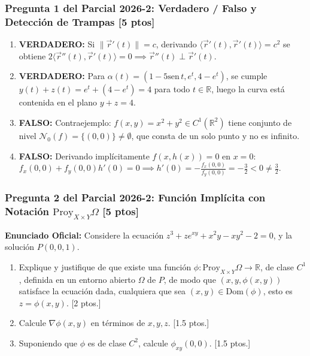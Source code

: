 \documentclass[11pt,a4paper]{article}
\begin{document}
\subsubsection*{Pregunta 1 del Parcial 2026-2: Verdadero / Falso y Detección de Trampas [5 ptos]}
\begin{enumerate}[label=\textbf{\alph*)}]
  \item \textbf{VERDADERO:} Si $\|\vec{r}'(t)\| = c$, derivando $\langle \vec{r}'(t), \vec{r}'(t)\rangle = c^2$ se obtiene $2\langle \vec{r}''(t), \vec{r}'(t)\rangle = 0 \implies \vec{r}''(t) \perp \vec{r}'(t)$.
  \item \textbf{VERDADERO:} Para $\alpha(t) = (1-5\text{sen}\,t, e^t, 4-e^t)$, se cumple $y(t)+z(t) = e^t + (4-e^t) = 4$ para todo $t\in\mathbb{R}$, luego la curva está contenida en el plano $y+z=4$.
  \item \textbf{FALSO:} Contraejemplo: $f(x,y) = x^2+y^2 \in C^1(\mathbb{R}^2)$ tiene conjunto de nivel $\mathcal{N}_0(f) = \{(0,0)\} \neq \emptyset$, que consta de un solo punto y no es infinito.
  \item \textbf{FALSO:} Derivando implícitamente $f(x,h(x))=0$ en $x=0$: $f_x(0,0) + f_y(0,0)h'(0) = 0 \implies h'(0) = -\frac{f_x(0,0)}{f_y(0,0)} = -\frac{3}{2} < 0 \neq \frac{3}{2}$.
\end{enumerate}

\subsubsection*{Pregunta 2 del Parcial 2026-2: Función Implícita con Notación $\text{Proy}_{X\times Y}\Omega$ [5 ptos]}
\begin{tcolorbox}[colback=white,colframe=gray!40,arc=1mm,boxrule=0.5pt]
\textbf{Enunciado Oficial:} Considere la ecuación $z^3 + z e^{xy} + x^2y - xy^2 - 2 = 0$, y la solución $P(0,0,1)$.
\begin{enumerate}[label=\textbf{\alph*)}]
  \item Explique y justifique de que existe una función $\phi: \text{Proy}_{X\times Y}\Omega \to \mathbb{R}$, de clase $C^1$, definida en un entorno abierto $\Omega$ de $P$, de modo que $(x,y,\phi(x,y))$ satisface la ecuación dada, cualquiera que sea $(x,y) \in \text{Dom}(\phi)$, esto es $z = \phi(x,y)$. \hfill [2 ptos.]
  \item Calcule $\nabla \phi(x,y)$ en términos de $x,y,z$. \hfill [1.5 ptos.]
  \item Suponiendo que $\phi$ es de clase $C^2$, calcule $\phi_{xy}(0,0)$. \hfill [1.5 ptos.]
\end{enumerate}
\end{tcolorbox}
\end{document}
